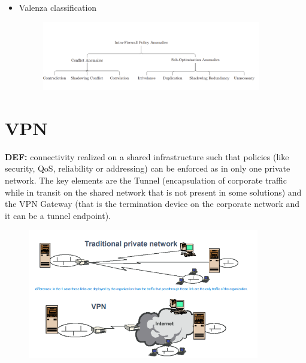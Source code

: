 \documentclass{article}
\begin{document}
\begin{itemize}
\begin{itemize}
\begin{itemize}
\begin{itemize}
\begin{figure}[H]
                  \end{figure}
              \item Valenza classification
                  \begin{figure}[H]
                    \centering
                    \includegraphics[width=0.90\textwidth]{figure/Valenza_classification.png}
                  \end{figure}
            \end{itemize}
        \end{itemize}
    \end{itemize}
\end{itemize}

\section{VPN}
\textbf{DEF:} connectivity realized on a shared infrastructure such that policies (like security, QoS, reliability or addressing) can be enforced as in only one private network. The key elements are the Tunnel (encapsulation of corporate traffic while in transit on the shared network that is not present in some solutions) and the VPN Gateway (that is the termination device on the corporate network and it can be a tunnel endpoint).

\begin{figure}[H]
    \centering
    \includegraphics[width=0.90\textwidth]{figure/tradition_vs_VPN.png}
\end{figure}
\end{document}

